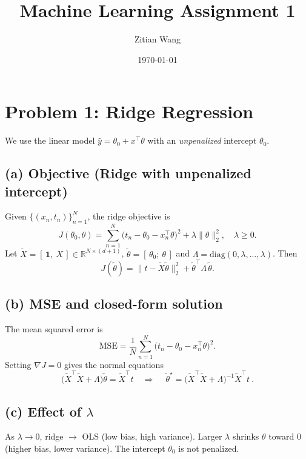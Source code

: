 \documentclass[11pt]{article}
\title{Machine Learning Assignment 1}
\author{Zitian Wang}
\date{\today}
\begin{document}
\maketitle

\section{Problem 1: Ridge Regression}

We use the linear model $\hat y=\theta_0 + x^\top\theta$ with an \emph{unpenalized} intercept $\theta_0$.

\subsection*{(a) Objective (Ridge with unpenalized intercept)}
Given $\{(x_n,t_n)\}_{n=1}^N$, the ridge objective is
\[
J(\theta_0,\theta)
=\sum_{n=1}^N\bigl(t_n-\theta_0-x_n^\top\theta\bigr)^2
+\lambda\lVert\theta\rVert_2^2,\quad \lambda\ge 0.
\]
Let $\tilde X=[\,\mathbf 1,\ X\,]\in\mathbb R^{N\times(d+1)}$, $\tilde\theta=[\,\theta_0;\ \theta\,]$ and
$\Lambda=\mathrm{diag}(0,\lambda,\ldots,\lambda)$. Then
\[
J(\tilde\theta)=\lVert t-\tilde X\tilde\theta\rVert_2^2+\tilde\theta^\top\Lambda\,\tilde\theta.
\]

\subsection*{(b) MSE and closed-form solution}
The mean squared error is
\[
\mathrm{MSE}=\frac{1}{N}\sum_{n=1}^N\bigl(t_n-\theta_0-x_n^\top\theta\bigr)^2.
\]
Setting $\nabla J=0$ gives the normal equations
\[
\bigl(\tilde X^\top\tilde X+\Lambda\bigr)\tilde\theta=\tilde X^\top t
\quad\Rightarrow\quad
\boxed{\ \tilde\theta^\star=\bigl(\tilde X^\top\tilde X+\Lambda\bigr)^{-1}\tilde X^\top t\ }.
\]

\subsection*{(c) Effect of $\lambda$}
As $\lambda\to 0$, ridge $\to$ OLS (low bias, high variance). Larger $\lambda$ shrinks $\theta$ toward $0$ (higher bias, lower variance). The intercept $\theta_0$ is not penalized.
\end{document}
